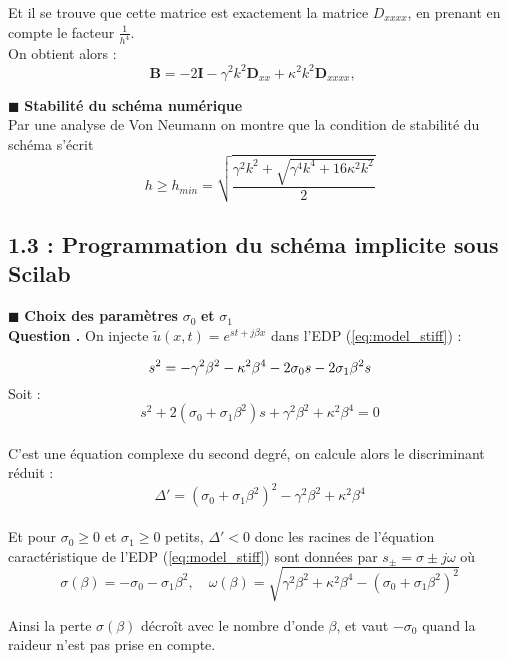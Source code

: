 \documentclass[a4,12pt]{article}
\newcommand{\B}{\mathbf{B}}
\newcommand{\D}{\mathbf{D}}
\newcounter{Nbquestion}
\newcommand*\question{%
\stepcounter{Nbquestion}%
\textbf{Question \theNbquestion. }}
\begin{document}
    Et il se trouve que cette matrice est exactement la matrice $D_{xxxx}$, en prenant en compte le facteur $\frac{1}{h^4}$.\\

  On obtient alors :
  $$ \B=-2\mathbf{I}-\gamma^2 k^2 \D_{xx}+\kappa^2 k^2\D_{xxxx}, \quad $$


  \hspace{0.5cm} $\blacksquare$ \textbf{Stabilité du schéma numérique} \\

  Par une analyse de Von Neumann on montre que la condition de stabilité du schéma s'écrit 
  \[
    h\geqslant h_{min}=\sqrt{\frac{\gamma^2k^2+\sqrt{\gamma^4 k^4+16\kappa^2 k^2}}{2}}
  \]

  \subsection*{1.3 : Programmation du schéma implicite sous Scilab}

  \hspace{0.5cm} $\blacksquare$ \textbf{Choix des paramètres} $\sigma_0$  \textbf{et}  $\sigma_1$\\


  \question On injecte $\tilde u(x,t)=e^{st+j\beta x}$ dans l'EDP (\ref{eq:model_stiff}) :

  \[
s^2 = -\gamma^2 \beta^2 - \kappa^2 \beta^4 - 2 \sigma_0 s - 2 \sigma_1 \beta^2 s\\
  \]
  Soit :
  \[
s^2 + 2(\sigma_0 + \sigma_1 \beta^2) s + \gamma^2 \beta^2 + \kappa^2 \beta^4 = 0
  \]~\\
  C'est une équation complexe du second degré, on calcule alors le discriminant réduit :
  \[
\Delta' = (\sigma_0 + \sigma_1 \beta^2)^2 - \gamma^2 \beta^2 + \kappa^2 \beta^4
  \]~\\
  Et pour $\sigma_0\geqslant 0$ et $\sigma_1\geqslant 0$ petits, $\Delta' < 0$ donc les racines de l'équation caractéristique de l'EDP (\ref{eq:model_stiff}) sont données par $s_{\pm}=\sigma\pm j\omega$ où 
  \[
    \sigma(\beta)=-\sigma_0-\sigma_1\beta^2,\quad \omega(\beta)=\sqrt{\gamma^2 \beta^2+\kappa^2\beta^4-(\sigma_0+\sigma_1\beta^2)^2}
  \]

  Ainsi la perte $\sigma(\beta)$ décroît avec le nombre d'onde $\beta$, et vaut $-\sigma_0$ quand la raideur n'est pas prise en compte.\\
\end{document}
